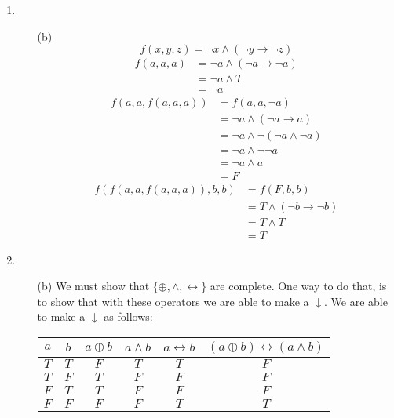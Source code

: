 \documentclass[fleqn]{article}
\begin{document}
\begin{enumerate}
	\item %
	\begin{enumerate}
		\item[(b)]
		\[f(x, y, z) = \lnot x \land (\lnot y \rightarrow \lnot z)\]
		\begin{align*}
			f(a, a, a) &= \lnot a \land (\lnot a \rightarrow \lnot a) \\
			&= \lnot a \land T \\
			&= \lnot a
		\end{align*}
		\begin{align*}
			f(a, a, f(a, a, a)) &= f(a, a, \lnot a) \\
			&= \lnot a \land (\lnot a \rightarrow a) \\
			&= \lnot a \land \lnot (\lnot a \land \lnot a) \\
			&= \lnot a \land \lnot \lnot a \\
			&= \lnot a \land a \\
			&= F
		\end{align*}
		\begin{align*}
			f(f(a, a, f(a, a, a)), b, b) &= f(F, b, b) \\
			&= T \land (\lnot b \rightarrow \lnot b) \\
			&= T \land T \\
			&= T
		\end{align*}
	\end{enumerate}

	\item %
	\begin{enumerate}
		\item[(b)]
		We must show that \(\{\oplus, \land, \leftrightarrow\}\) are complete. One way to do that, is to show that with these operators we are able to make a \(\downarrow\). We are able to make a \(\downarrow\) as follows:

		\begin{tabular}{||c|c||c|c|c||c||}
			\hline
			\(a\) & \(b\) & \(a \oplus b\) & \(a \land b\) & \(a \leftrightarrow b\) & \((a \oplus b) \leftrightarrow (a \land b)\) \\
			\hline
			\(T\) & \(T\) & \(F\) & \(T\) & \(T\) & \(F\) \\
			\(T\) & \(F\) & \(T\) & \(F\) & \(F\) & \(F\) \\
			\(F\) & \(T\) & \(T\) & \(F\) & \(F\) & \(F\) \\
			\(F\) & \(F\) & \(F\) & \(F\) & \(T\) & \(T\) \\
			\hline
		\end{tabular}


\end{enumerate}
\end{enumerate}
\end{document}
